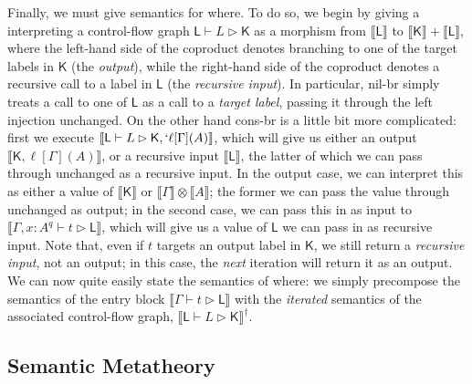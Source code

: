 \documentclass[acmsmall,screen,review]{acmart}
\newcommand{\ms}[1]{\ensuremath{\mathsf{#1}}}
\newcommand{\lbl}[1]{{`#1}}
\newcommand{\thyp}[3]{#1: {#2}^{#3}}
\newcommand{\lhyp}[3]{#1[#2](#3)}
\newcommand{\llhyp}[3]{\lhyp{\lbl{#1}}{#2}{#3}}
\newcommand{\rle}[1]{{\scriptsize\textsf{#1}}}
\newcommand{\haslb}[3]{#1 \vdash #2 \rhd #3}
\newcommand{\lhaslb}[3]{#1 \vdash #2 \rhd #3}
\newcommand{\dnt}[1]{\llbracket{#1}\rrbracket}
\begin{document}
Finally, we must give semantics for \rle{where}. To do so, we begin by giving a
interpreting a control-flow graph \(\lhaslb{\ms{L}}{L}{\ms{K}}\) as a morphism
from \(\dnt{\ms{L}}\) to \(\dnt{\ms{K}} + \dnt{\ms{L}}\), where the left-hand
side of the coproduct denotes branching to one of the target labels in
\(\ms{K}\) (the \textit{output}), while the right-hand side of the coproduct
denotes a recursive call to a label in \(\ms{L}\) (the \textit{recursive
input}). In particular, \rle{nil-br} simply treats a call to one of \(\ms{L}\)
as a call to a \textit{target label}, passing it through the left injection
unchanged. On the other hand \rle{cons-br} is a little bit more complicated:
first we execute \(\dnt{\lhaslb{\ms{L}}{L}{\ms{K}, \llhyp{\ell}{\Gamma}{A}}}\),
which will give us either an output \(\dnt{\ms{K}, \lhyp{\ell}{\Gamma}{A}}\), or
a recursive input \(\dnt{\ms{L}}\), the latter of which we can pass through
unchanged as a recursive input. In the output case, we can interpret this as
either a value of \(\dnt{\ms{K}}\) or \(\dnt{\Gamma} \otimes \dnt{A}\); the
former we can pass the value through unchanged as output; in the second case, we
can pass this in as input to \(\dnt{\haslb{\Gamma,
\thyp{x}{A}{q}}{t}{\ms{L}}}\), which will give us a value of \(\ms{L}\) we can
pass in as recursive input. Note that, even if \(t\) targets an output label in
\(\ms{K}\), we still return a \textit{recursive input}, not an output; in this
case, the \textit{next} iteration will return it as an output. We can now quite
easily state the semantics of \rle{where}: we simply precompose the semantics of
the entry block \(\dnt{\haslb{\Gamma}{t}{\ms{L}}}\) with the \textit{iterated}
semantics of the associated control-flow graph,
\(\dnt{\lhaslb{\ms{L}}{L}{\ms{K}}}^\dagger\).

\subsection{Semantic Metatheory}
\end{document}
